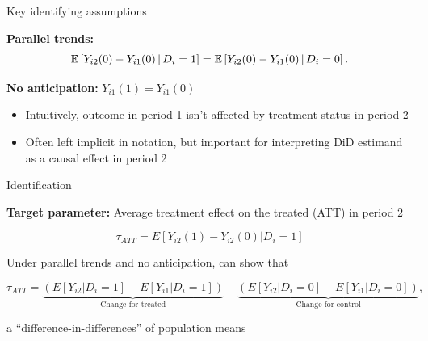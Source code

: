 \documentclass[aspectratio = 169, 12pt]{beamer}
\begin{document}
\begin{frame}{Key identifying assumptions}
  \begin{wideitemize}
    \item
    \textbf{Parallel trends:}
    \begin{equation}
      \mathbb{E}\left[ Y_{i2}(0) - Y_{i1}(0) \,|\, D_i = 1 \right] = \mathbb{E}\left[ Y_{i2}(0) - Y_{i1}(0) \,|\, D_i = 0 \right] . \label{eqn: pt - 2 periods}
    \end{equation}


    \pause
    \item
    \textbf{No anticipation:} $Y_{i1}(1) = Y_{i1}(0)$
    \begin{itemize}
      \item
            Intuitively, outcome in period 1 isn't affected by treatment status in period 2

      \item
            Often left implicit in notation, but important for interpreting DiD estimand as a causal effect in period 2
    \end{itemize}
  \end{wideitemize}
\end{frame}


\begin{frame}{Identification}
  \begin{wideitemize}
    \item
    \textbf{Target parameter:} Average treatment effect on the treated (ATT) in period 2

    $$\tau_{ATT} = E[Y_{i2}(1) - Y_{i2}(0) | D_i=1] $$

    \pause
    \item
    Under parallel trends and no anticipation, can show that

    $$\tau_{ATT} = \underbrace{(E[Y_{i2} | D_i = 1] - E[Y_{i1}| D_i =1])}_{\text{Change for treated}} - \underbrace{(E[Y_{i2} | D_i = 0] - E[Y_{i1}| D_i =0]) }_{\text{Change for control}},$$

    \noindent a ``difference-in-differences'' of population means
  \end{wideitemize}
\end{frame}
\end{document}
